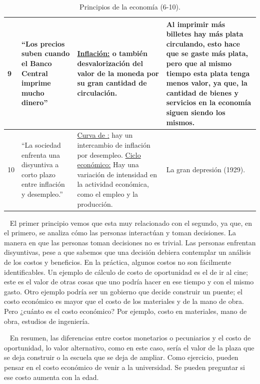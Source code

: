 \documentclass[
  letterpaper,
  DIV=11,
  numbers=noendperiod]{scrreport}
\begin{document}
\begin{table}[H]
\begin{tabular}{|p{16mm}|p{30mm}|p{59mm}|p{40mm}|}
        9 & \hspace{2mm} “Los precios suben cuando el Banco Central imprime mucho dinero” & \hspace{2mm} \underline{Inflación:} o también desvalorización del valor de la moneda por su gran cantidad de circulación. & \hspace{2mm} Al imprimir más billetes hay más plata circulando, esto hace que se gaste más plata, pero que al mismo tiempo esta plata tenga menos valor, ya que, la cantidad de bienes y servicios en la economía siguen siendo los mismos. \\ \hline
        10 & \hspace{2mm} “La sociedad enfrenta una disyuntiva a corto plazo entre inflación y desempleo.” & \hspace{2mm} \underline{Curva de \cite{phillips_relation_1958}:} hay un intercambio de inflación por desempleo. \underline{Ciclo económico:} Hay una variación de intensidad en la actividad económica, como el empleo y la producción. & \hspace{2mm} La gran depresión (1929). \\ \hline
    \end{tabular}
    \caption{Principios de la economía (6-10).}
    \label{tabla:final}
\end{table}

~ El primer principio vemos que esta muy relacionado con el segundo, ya
que, en el primero, se analiza cómo las personas interactúan y toman
decisiones. La manera en que las personas toman decisiones no es
trivial. Las personas enfrentan disyuntivas, pese a que sabemos que una
decisión debiera contemplar un análisis de los costos y beneficios. En
la práctica, algunos costos no son fácilmente identificables. Un ejemplo
de cálculo de costo de oportunidad es el de ir al cine; este es el valor
de otras cosas que uno podría hacer en ese tiempo y con el mismo gasto.
Otro ejemplo podría ser un gobierno que decide construir un puente; el
costo económico es mayor que el costo de los materiales y de la mano de
obra. Pero ¿cuánto es el costo económico? Por ejemplo, costo en
materiales, mano de obra, estudios de ingeniería.

~ En resumen, las diferencias entre costos monetarios o pecuniarios y el
costo de oportunidad, lo valor alternativo, como en este caso, sería el
valor de la plaza que se deja construir o la escuela que se deja de
ampliar. Como ejercicio, pueden pensar en el costo económico de venir a
la universidad. Se pueden preguntar si ese costo aumenta con la edad.
\end{document}
